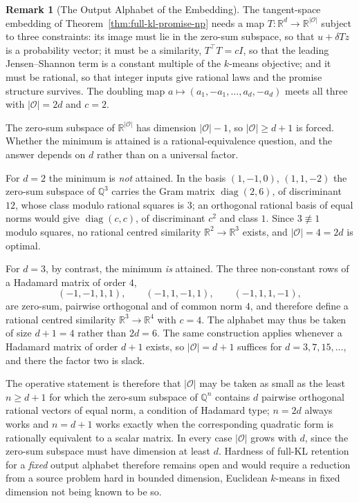 \documentclass[12pt]{article}
\theoremstyle{definition}
\newtheorem{remark}[theorem]{Remark}
\begin{document}
\begin{remark}[The Output Alphabet of the Embedding]
\label{rem:output-alphabet-2d}
The tangent-space embedding of Theorem~\ref{thm:full-kl-promise-np} needs a map
$T:\mathbb R^{d}\to\mathbb R^{|\mathcal O|}$ subject to three constraints: its
image must lie in the zero-sum subspace, so that $u+\delta Tz$ is a probability
vector; it must be a similarity, $T^{\!\top}T=cI$, so that the leading
Jensen--Shannon term is a constant multiple of the $k$-means objective; and it
must be rational, so that integer inputs give rational laws and the promise
structure survives.  The doubling map
$a\mapsto(a_1,-a_1,\dots,a_d,-a_d)$ meets all three with $|\mathcal O|=2d$ and
$c=2$.

The zero-sum subspace of $\mathbb R^{|\mathcal O|}$ has dimension
$|\mathcal O|-1$, so $|\mathcal O|\ge d+1$ is forced.  Whether the minimum is
attained is a rational-equivalence question, and the answer depends on $d$
rather than on a universal factor.

For $d=2$ the minimum is \emph{not} attained.  In the basis $(1,-1,0)$,
$(1,1,-2)$ the zero-sum subspace of $\mathbb Q^{3}$ carries the Gram matrix
$\operatorname{diag}(2,6)$, of discriminant $12$, whose class modulo rational
squares is $3$; an orthogonal rational basis of equal norms would give
$\operatorname{diag}(c,c)$, of discriminant $c^{2}$ and class $1$.  Since
$3\not\equiv1$ modulo squares, no rational centred similarity
$\mathbb R^{2}\to\mathbb R^{3}$ exists, and $|\mathcal O|=4=2d$ is optimal.

For $d=3$, by contrast, the minimum \emph{is} attained.  The three non-constant
rows of a Hadamard matrix of order $4$,
\[
(-1,-1,1,1),\qquad(-1,1,-1,1),\qquad(-1,1,1,-1),
\]
are zero-sum, pairwise orthogonal and of common norm $4$, and therefore define
a rational centred similarity $\mathbb R^{3}\to\mathbb R^{4}$ with $c=4$.  The
alphabet may thus be taken of size $d+1=4$ rather than $2d=6$.  The same
construction applies whenever a Hadamard matrix of order $d+1$ exists, so
$|\mathcal O|=d+1$ suffices for $d=3,7,15,\dots$, and there the factor two is
slack.

The operative statement is therefore that $|\mathcal O|$ may be taken as small
as the least $n\ge d+1$ for which the zero-sum subspace of $\mathbb Q^{n}$
contains $d$ pairwise orthogonal rational vectors of equal norm, a condition of
Hadamard type; $n=2d$ always works and $n=d+1$ works exactly when the
corresponding quadratic form is rationally equivalent to a scalar matrix.  In
every case $|\mathcal O|$ grows with $d$, since the zero-sum subspace must have
dimension at least $d$.  Hardness of full-KL retention for a \emph{fixed}
output alphabet therefore remains open and would require a reduction from a
source problem hard in bounded dimension, Euclidean $k$-means in fixed
dimension not being known to be so.
\end{remark}
\end{document}
